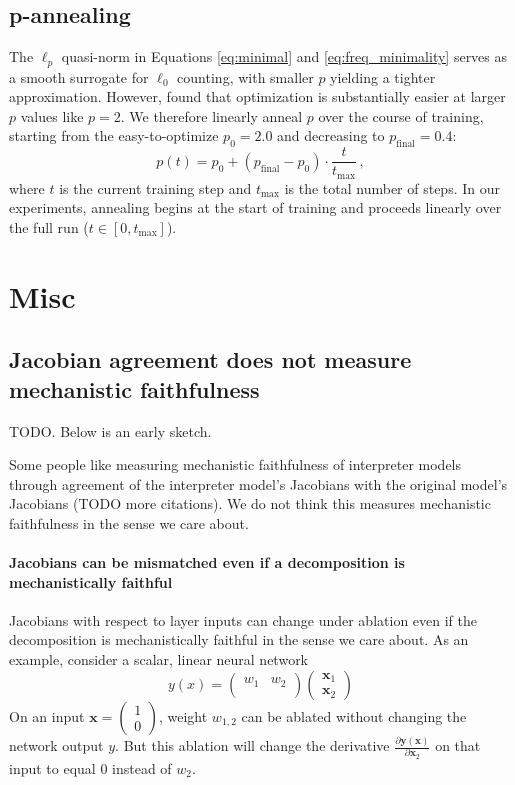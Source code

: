\documentclass{article}
\begin{document}
\subsection{p-annealing}
The $\ell_p$ quasi-norm in Equations \eqref{eq:minimal} and \eqref{eq:freq_minimality} serves as a
smooth surrogate for $\ell_0$ counting, with smaller $p$ yielding a tighter approximation.
However, \cite{bushnaq2025spd} found that optimization is substantially easier at larger $p$
values like $p = 2$. We therefore linearly anneal $p$ over the
course of training, starting from the easy-to-optimize $p_0 = 2.0$ and decreasing to
$p_{\mathrm{final}} = 0.4$:
\begin{equation}
  p(t) = p_0 + (p_{\mathrm{final}} - p_0) \cdot \frac{t}{t_{\max}}\,,
\end{equation}
where $t$ is the current training step and $t_{\max}$ is the total number of steps.
In our experiments, annealing begins at the start of training and proceeds linearly
over the full run ($t \in [0, t_{\max}]$).
\section{Misc}
\subsection{Jacobian agreement does not measure mechanistic faithfulness}
TODO. Below is an early sketch.

Some people like measuring mechanistic faithfulness of interpreter models through agreement of the interpreter model's Jacobians with the original model's Jacobians \citep{lindsey2025molts} (TODO more citations). We do not think this measures mechanistic faithfulness in the sense we care about.
\paragraph{Jacobians can be mismatched even if a decomposition is mechanistically faithful} 
Jacobians with respect to layer inputs can change under ablation even if the decomposition is mechanistically faithful in the sense we care about. As an example, consider a scalar, linear neural network 
\begin{equation}
y(x)= \begin{pmatrix}
w_{1} & w_{2}\\
\end{pmatrix}\begin{pmatrix}
\mathbf{x}_1 \\
\mathbf{x}_2
\end{pmatrix}
\end{equation}
On an input $\mathbf{x}=\begin{pmatrix}
1 \\
0\end{pmatrix}$, weight $w_{1,2}$ can be ablated without changing the network output $y$. But this ablation will change the derivative $\frac{\partial\mathbf{y}(\mathbf{x})}{\partial\mathbf{x}_2}$ on that input to equal $0$ instead of $w_2$. 
\end{document}
